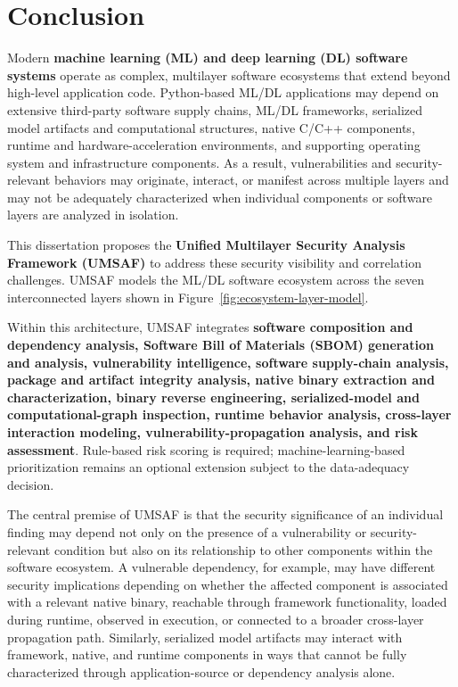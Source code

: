 \documentclass[
  12pt,
  letterpaper,
  oneside]{report}
\begin{document}
\chapter{Conclusion}\label{14-conclusion}

Modern \textbf{machine learning (ML) and deep learning (DL) software
systems} operate as complex, multilayer software ecosystems that extend
beyond high-level application code. Python-based ML/DL applications may
depend on extensive third-party software supply chains, ML/DL
frameworks, serialized model artifacts and computational structures,
native C/C++ components, runtime and hardware-acceleration environments,
and supporting operating system and infrastructure components. As a
result, vulnerabilities and security-relevant behaviors may originate,
interact, or manifest across multiple layers and may not be adequately
characterized when individual components or software layers are analyzed
in isolation.

This dissertation proposes the \textbf{Unified Multilayer Security
Analysis Framework (UMSAF)} to address these security visibility and
correlation challenges. UMSAF models the ML/DL software ecosystem across
the seven interconnected layers shown in
Figure~\ref{fig:ecosystem-layer-model}.

Within this architecture, UMSAF integrates \textbf{software composition
and dependency analysis, Software Bill of Materials (SBOM) generation
and analysis, vulnerability intelligence, software supply-chain
analysis, package and artifact integrity analysis, native binary
extraction and characterization, binary reverse engineering,
serialized-model and computational-graph inspection, runtime behavior
analysis, cross-layer interaction modeling, vulnerability-propagation
analysis, and risk assessment}. Rule-based risk scoring is required;
machine-learning-based prioritization remains an optional extension
subject to the data-adequacy decision.

The central premise of UMSAF is that the security significance of an
individual finding may depend not only on the presence of a
vulnerability or security-relevant condition but also on its
relationship to other components within the software ecosystem. A
vulnerable dependency, for example, may have different security
implications depending on whether the affected component is associated
with a relevant native binary, reachable through framework
functionality, loaded during runtime, observed in execution, or
connected to a broader cross-layer propagation path. Similarly,
serialized model artifacts may interact with framework, native, and
runtime components in ways that cannot be fully characterized through
application-source or dependency analysis alone.
\end{document}
